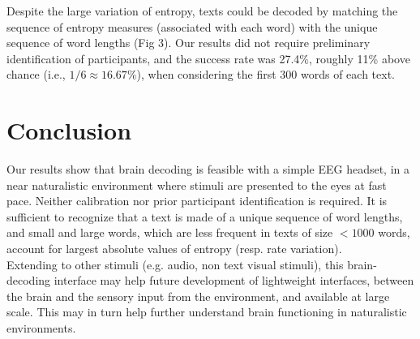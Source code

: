 \documentclass[10pt]{article}
\begin{document}
Despite the large variation of entropy, texts could be decoded by matching the sequence of entropy measures (associated with each word) with the unique sequence of word lengths (Fig 3). Our results did not require preliminary identification of participants, and the success rate was 27.4\%, roughly 11\% above chance (i.e., $1/6 \approx 16.67\%$), when considering the first 300 words of each text.

\section{Conclusion}
Our results show that brain decoding is feasible with a simple EEG headset, in a near naturalistic environment where stimuli are presented to the eyes at fast pace. Neither calibration nor prior participant identification is required. It is sufficient to recognize that a text is made of a unique sequence of word lengths, and small and large words, which are less frequent in texts of size $< 1000$ words, account for largest absolute values of entropy (resp. rate variation).\\

Extending to other stimuli (e.g. audio, non text visual stimuli), this brain-decoding interface may help future development of lightweight interfaces, between the brain and the sensory input from the environment, and available at large scale. This may in turn help further understand brain functioning in naturalistic environments.



%
\end{document}
